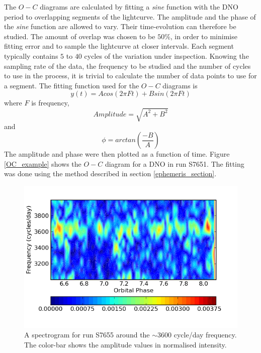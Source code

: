
The $O-C$  diagrams are calculated by fitting a \textit{sine} function with the DNO period to overlapping segments of the lightcurve. The amplitude and the phase of the \textit{sine} function are allowed to vary. Their time-evolution can therefore be studied. The amount of overlap was chosen to be $50\%$, in order to minimise fitting error and to sample the lightcurve at closer intervals. Each segment typically contains $5$ to $40$ cycles of the variation under inspection. Knowing the sampling rate of the data, the frequency to be studied and the number of cycles to use in the process, it is trivial to calculate the number of data points to use for a segment. The fitting function used for the $O-C$ diagrams is $$y(t) = Acos(2\pi Ft) + Bsin(2\pi Ft)$$ where $F$ is frequency, $$Amplitude =\sqrt{A^{2} + B^{2}} $$ and $$ \phi = arctan(\frac{-B}{A}) $$
The amplitude and phase were then plotted as a function of time. Figure \ref{OC_example} shows the $O-C$ diagram for a DNO in run S7651. The fitting was done using the method described in section \ref{ephemeris_section}.


\begin{figure}
 \centering
 \includegraphics[width = 0.8\columnwidth, bb=0 0 600 400]{images/august_phot/S7655/S7655_DNO_trailed_FT.png}
 \caption[Spectrogram for run S7655.]{A spectrogram for run S7655 around the $\sim3600$ cycle/day frequency. The color-bar shows the amplitude values in normalised intensity.  }


 \label{trailed_ft_example}
\end{figure}

